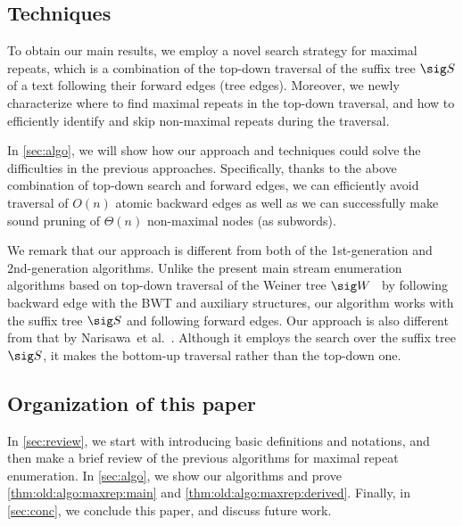 
\subsection{Techniques}


To obtain our main results, we employ a novel search strategy for maximal repeats, which is a combination of the top-down traversal of the suffix tree $\sig S$ of a text following their forward edges (tree edges). 
Moreover, we newly characterize where to find maximal repeats in the top-down traversal, and how to efficiently identify and skip non-maximal repeats during the traversal. 

In \cref{sec:algo}, we will show how our approach and techniques could solve the difficulties in the previous approaches. Specifically, thanks to the above combination of top-down search and forward edges, we can efficiently avoid traversal of $O(n)$ atomic backward edges as well as we can successfully make sound pruning of $\Theta(n)$ non-maximal nodes (as subwords). 

We remark that our approach is different from both of the 1st-generation and 2nd-generation algorithms. Unlike the present main stream enumeration algorithms based on top-down traversal of the Weiner tree $\sig W$~\cite{beller:berger2012space:efficient:bbo,belazzougui2020linear,nishimoto:cpm2021enum} by following backward edge with the BWT and auxiliary structures, our algorithm works with the suffix tree $\sig S$ and following forward edges. 
Our approach is also different from that by Narisawa~et al.~\cite{narisawa2007efficient}. Although it employs the search over the suffix tree $\sig S$, it makes the bottom-up traversal rather than the top-down one. 

\subsection{Organization of this paper}
In \cref{sec:review}, we start with introducing basic definitions and notations, and then make a brief review of the previous algorithms for maximal repeat enumeration. In \cref{sec:algo}, we show our algorithms and prove \cref{thm:old:algo:maxrep:main} and \cref{thm:old:algo:maxrep:derived}. Finally, in \cref{sec:conc}, we conclude this paper, and discuss future work. 

